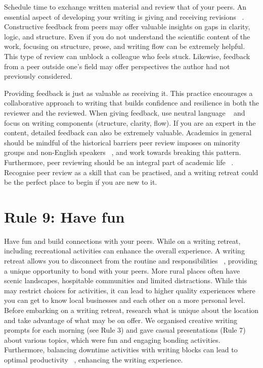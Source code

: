 \documentclass[10pt,letterpaper]{article}
\begin{document}
Schedule time to exchange written material and review that of your peers. An essential aspect of developing your writing is giving and receiving revisions ~\cite{guilford2001, reynolds2011}. Constructive feedback from peers may offer valuable insights on gaps in clarity, logic, and structure. Even if you do not understand the scientific content of the work, focusing on structure, prose, and writing flow can be extremely helpful. This type of review can unblock a colleague who feels stuck. Likewise, feedback from a peer outside one's field may offer perspectives the author had not previously considered.

Providing feedback is just as valuable as receiving it. This practice encourages a collaborative approach to writing that builds confidence and resilience in both the reviewer and the reviewed. When giving feedback, use neutral language ~\cite{parsons2021} and focus on writing components (structure, clarity, flow). If you are an expert in the content, detailed feedback can also be extremely valuable. Academics in general should be mindful of the historical barriers peer review imposes on minority groups and non-English speakers ~\cite{smith2023, saleh2024}, and work towards breaking this pattern. Furthermore, peer reviewing should be an integral part of academic life ~\cite{borja2024}. Recognise peer review as a skill that can be practised, and a writing retreat could be the perfect place to begin if you are new to it.

\section*{Rule 9: Have fun}

Have fun and build connections with your peers. While on a writing retreat, including recreational activities can enhance the overall experience. A writing retreat allows you to disconnect from the routine and responsibilities ~\cite{murray2013}, providing a unique opportunity to bond with your peers. More rural places often have scenic landscapes, hospitable communities and limited distractions. While this may restrict choices for activities, it can lead to higher quality experiences where you can get to know local businesses and each other on a more personal level. Before embarking on a writing retreat, research what is unique about the location and take advantage of what may be on offer. We organised creative writing prompts for each morning (see Rule 3) and gave casual presentations (Rule 7) about various topics, which were fun and engaging bonding activities. Furthermore, balancing downtime activities with writing blocks can lead to optimal productivity ~\cite{eardley2021, lyubykh2022}, enhancing the writing experience.
\end{document}

